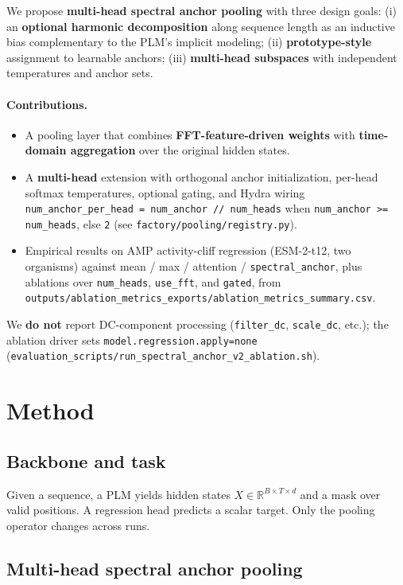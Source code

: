 \documentclass[11pt]{article}
\begin{document}
We propose \textbf{multi-head spectral anchor pooling} with three design goals: (i) an \textbf{optional harmonic decomposition} along sequence length as an inductive bias complementary to the PLM's implicit modeling; (ii) \textbf{prototype-style} assignment to learnable anchors; (iii) \textbf{multi-head subspaces} with independent temperatures and anchor sets.

\paragraph{Contributions.}
\begin{itemize}
  \item A pooling layer that combines \textbf{FFT-feature-driven weights} with \textbf{time-domain aggregation} over the original hidden states.
  \item A \textbf{multi-head} extension with orthogonal anchor initialization, per-head softmax temperatures, optional gating, and Hydra wiring \texttt{num\_anchor\_per\_head = num\_anchor // num\_heads} when \texttt{num\_anchor >= num\_heads}, else \texttt{2} (see \texttt{factory/pooling/registry.py}).
  \item Empirical results on AMP activity-cliff regression (ESM-2-t12, two organisms) against mean / max / attention / \texttt{spectral\_anchor}, plus ablations over \texttt{num\_heads}, \texttt{use\_fft}, and \texttt{gated}, from \texttt{outputs/ablation\_metrics\_exports/ablation\_metrics\_summary.csv}.
\end{itemize}

We \textbf{do not} report DC-component processing (\texttt{filter\_dc}, \texttt{scale\_dc}, etc.); the ablation driver sets \texttt{model.regression.apply=none} (\texttt{evaluation\_scripts/run\_spectral\_anchor\_v2\_ablation.sh}).

\section{Method}
\subsection{Backbone and task}
Given a sequence, a PLM yields hidden states $X \in \mathbb{R}^{B \times T \times d}$ and a mask over valid positions. A regression head predicts a scalar target. Only the pooling operator changes across runs.

\subsection{Multi-head spectral anchor pooling}
\end{document}
